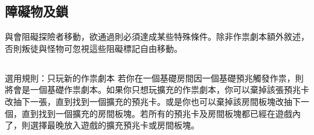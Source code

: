 
\subsection{障礙物及鎖}

與會阻礙探險者移動，欲通過則必須達成某些特殊條件。除非作祟劇本額外敘述，否則叛徒與怪物可忽視這些阻礙標記自由移動。


\subsection*{}

\begin{RuleBox}{選用規則：只玩新的作祟劇本}
  若你在一個基礎房間因一個基礎預兆觸發作祟，則將會是一個基礎作祟劇本。如果你只想玩擴充的作祟劇本，你可以棄掉該張預兆卡改抽下一張，直到找到一個擴充的預兆卡。或是你也可以棄掉該房間板塊改抽下一個，直到找到一個擴充的房間板塊。若所有的預兆卡及房間板塊都已經在遊戲內了，則選擇最晚放入遊戲的擴充預兆卡或房間板塊。
\end{RuleBox}
